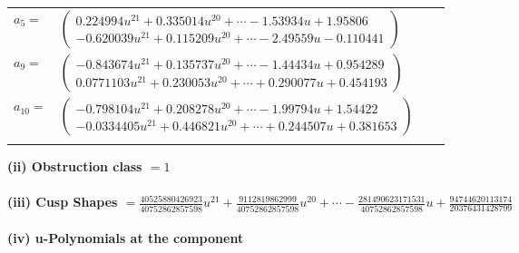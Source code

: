 \documentclass[1p]{elsarticle_modified}
\theoremstyle{definition}
\begin{document}
\begin{tabular}{m{7pt} m{180pt} m{7pt} m{180pt} }
\flushright $a_{5}=$&$\begin{pmatrix}0.224994 u^{21}+0.335014 u^{20}+\cdots-1.53934 u+1.95806\\-0.620039 u^{21}+0.115209 u^{20}+\cdots-2.49559 u-0.110441\end{pmatrix}$ \\
\flushright $a_{9}=$&$\begin{pmatrix}-0.843674 u^{21}+0.135737 u^{20}+\cdots-1.44434 u+0.954289\\0.0771103 u^{21}+0.230053 u^{20}+\cdots+0.290077 u+0.454193\end{pmatrix}$ \\
\flushright $a_{10}=$&$\begin{pmatrix}-0.798104 u^{21}+0.208278 u^{20}+\cdots-1.99794 u+1.54422\\-0.0334405 u^{21}+0.446821 u^{20}+\cdots+0.244507 u+0.381653\end{pmatrix}$\\&\end{tabular}
\flushleft \textbf{(ii) Obstruction class $= 1$}\\~\\
\flushleft \textbf{(iii) Cusp Shapes $= \frac{40525880426923}{40752862857598} u^{21}+\frac{9112819862999}{40752862857598} u^{20}+\cdots-\frac{281490623171531}{40752862857598} u+\frac{94744620113174}{20376431428799}$}\\~\\
\newpage\renewcommand{\arraystretch}{1}
\flushleft \textbf{(iv) u-Polynomials at the component}\newline \\
\end{document}

